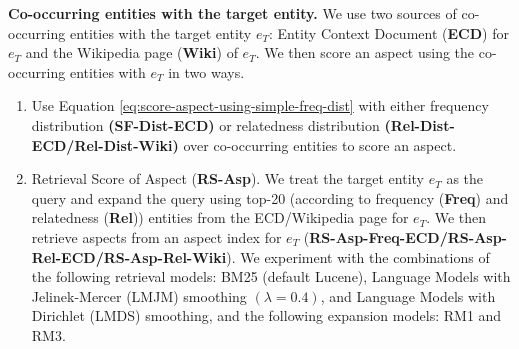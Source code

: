 \documentclass[sigconf,authordraft]{acmart}
\begin{document}
\textbf{Co-occurring entities with the target entity.} 
We use two sources of co-occurring entities with the target entity $e_T$: Entity Context Document (\textbf{ECD}) for $e_T$ and the Wikipedia page (\textbf{Wiki}) of $e_T$. We then score an aspect using the co-occurring entities with $e_T$ in two ways.

    
\begin{enumerate}
    \item Use Equation \ref{eq:score-aspect-using-simple-freq-dist} with either frequency distribution \textbf{(SF-Dist-ECD)} or relatedness distribution \textbf{(Rel-Dist-ECD/Rel-Dist-Wiki)} over co-occurring entities to score an aspect.
        
    \item Retrieval Score of Aspect (\textbf{RS-Asp}). We treat the target entity $e_T$ as the query and expand the query using top-20 (according to frequency (\textbf{Freq}) and relatedness (\textbf{Rel})) entities from the ECD/Wikipedia page for $e_T$. We then retrieve aspects from an aspect index for $e_T$ (\textbf{RS-Asp-Freq-ECD/RS-Asp-Rel-ECD/RS-Asp-Rel-Wiki}). We experiment with the combinations of the following retrieval models: BM25 (default Lucene), Language Models with Jelinek-Mercer (LMJM) smoothing $(\lambda = 0.4)$, and Language Models with Dirichlet (LMDS) smoothing, and the following expansion models: RM1 and RM3.
\end{enumerate}
    



    
\end{document}
